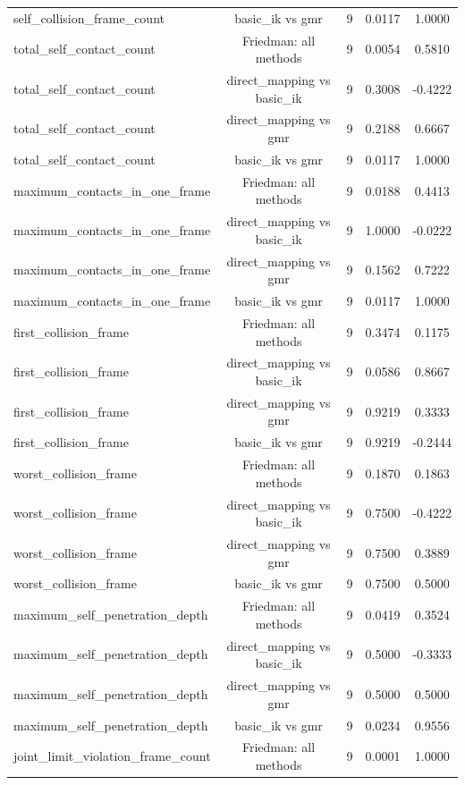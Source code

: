 \begin{table}[t]
{\begin{tabular}{lcccc}
self\_collision\_frame\_count & basic\_ik vs gmr & 9 & 0.0117 & 1.0000 \\
total\_self\_contact\_count & Friedman: all methods & 9 & 0.0054 & 0.5810 \\
total\_self\_contact\_count & direct\_mapping vs basic\_ik & 9 & 0.3008 & -0.4222 \\
total\_self\_contact\_count & direct\_mapping vs gmr & 9 & 0.2188 & 0.6667 \\
total\_self\_contact\_count & basic\_ik vs gmr & 9 & 0.0117 & 1.0000 \\
maximum\_contacts\_in\_one\_frame & Friedman: all methods & 9 & 0.0188 & 0.4413 \\
maximum\_contacts\_in\_one\_frame & direct\_mapping vs basic\_ik & 9 & 1.0000 & -0.0222 \\
maximum\_contacts\_in\_one\_frame & direct\_mapping vs gmr & 9 & 0.1562 & 0.7222 \\
maximum\_contacts\_in\_one\_frame & basic\_ik vs gmr & 9 & 0.0117 & 1.0000 \\
first\_collision\_frame & Friedman: all methods & 9 & 0.3474 & 0.1175 \\
first\_collision\_frame & direct\_mapping vs basic\_ik & 9 & 0.0586 & 0.8667 \\
first\_collision\_frame & direct\_mapping vs gmr & 9 & 0.9219 & 0.3333 \\
first\_collision\_frame & basic\_ik vs gmr & 9 & 0.9219 & -0.2444 \\
worst\_collision\_frame & Friedman: all methods & 9 & 0.1870 & 0.1863 \\
worst\_collision\_frame & direct\_mapping vs basic\_ik & 9 & 0.7500 & -0.4222 \\
worst\_collision\_frame & direct\_mapping vs gmr & 9 & 0.7500 & 0.3889 \\
worst\_collision\_frame & basic\_ik vs gmr & 9 & 0.7500 & 0.5000 \\
maximum\_self\_penetration\_depth & Friedman: all methods & 9 & 0.0419 & 0.3524 \\
maximum\_self\_penetration\_depth & direct\_mapping vs basic\_ik & 9 & 0.5000 & -0.3333 \\
maximum\_self\_penetration\_depth & direct\_mapping vs gmr & 9 & 0.5000 & 0.5000 \\
maximum\_self\_penetration\_depth & basic\_ik vs gmr & 9 & 0.0234 & 0.9556 \\
joint\_limit\_violation\_frame\_count & Friedman: all methods & 9 & 0.0001 & 1.0000 \\

\end{tabular}}
\end{table}
